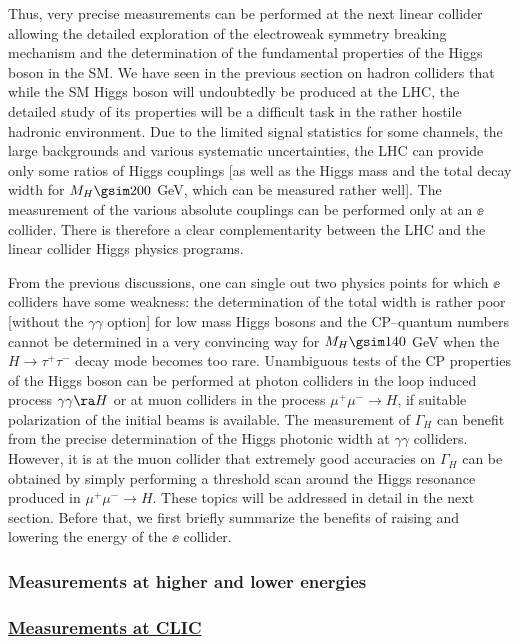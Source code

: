 Thus, very precise measurements can be performed at the next linear collider
allowing the detailed exploration of the electroweak symmetry breaking
mechanism and the determination of the fundamental properties of the Higgs boson
in the SM.  We have seen in the previous section on hadron colliders that 
while the SM Higgs boson will undoubtedly be produced at the LHC, the detailed
study of its properties will be a difficult task in the rather hostile hadronic
environment. Due to the limited signal statistics for some channels, the large
backgrounds and various systematic uncertainties, the LHC can provide only some
ratios of Higgs couplings  [as well as the Higgs mass and the total decay width
for $M_H \gsim 200$ GeV, which can be measured rather well]. The measurement of
the various absolute couplings can be performed only at an $\ee$ collider. 
There is therefore a clear complementarity between the LHC and the linear 
collider Higgs physics programs. \s

From the previous discussions, one can single out two physics points for which
$\ee$ colliders have some weakness: the determination of the total width is
rather poor [without the $\gamma \gamma$ option] for low mass Higgs bosons and
the CP--quantum numbers cannot be determined in a very convincing way for $M_H
\gsim 140$ GeV when the $H \to \tau^+ \tau^-$ decay mode becomes too rare.
Unambiguous tests of the CP properties of the Higgs boson can be performed at 
photon colliders in the loop induced process $\gamma \gamma \ra H$ or at muon
colliders in the process $\mu^+ \mu^- \to H$, if suitable polarization of the
initial beams is available.  The measurement of $\Gamma_H$ can benefit from the
precise determination of the Higgs photonic width at $\gamma \gamma$ colliders.
However, it is at the muon collider that extremely good accuracies on
$\Gamma_H$ can be obtained by simply performing a threshold scan around the
Higgs resonance produced in $\mu^+ \mu^- \to H$.  These topics will be
addressed in detail in the next section. Before that, we first briefly 
summarize the benefits of raising and lowering the energy of the $\ee$ collider.

\subsubsection{Measurements at higher and lower energies}

\subsubsection*{\underline{Measurements at CLIC}}

